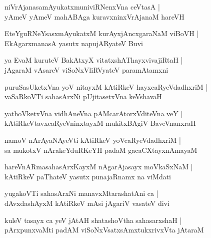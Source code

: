 \documentclass[twoside,12pt,openright]{book}
\newcounter{shloka}[chapter]
\begin{document}
\begin{shloka}%
niVrAjanasamAyukatxmuniviRNenxVna ceVtasA |\\
yAmeV yAmeV mahABAga kuravxninxVrAjanaM hareVH 
\end{shloka}

\begin{shloka}%
EteYguRNeYsasxmAyukatxM kurAyxjAncxgaraNaM viBoVH |\\
EkAgarxmanasA yasutx napujARyateV Buvi
\end{shloka}

\begin{shloka}%
ya EvaM kuruteV BakAtxyX vitatxshAThayxvivajiRtaH |\\
jAgaraM vAsareV viSoNxVliRVyateV paramAtamxni
\end{shloka}

\begin{shloka}%
puruSasUketxVna yoV nitayxM kAtiRkeV hayxcaRyeVdadhxriM |\\
vaSaRkoVTi sahasArxNi pUjitasetxVna keVshavaH 
\end{shloka}

\begin{shloka}%
yathoVketxVna vidhAneVna pAMcarAtorxVditeVna veY |\\
kAtiRkeVtavxcaRyeVninxtayxM mukitxBAgiV BaveVnanxraH 
\end{shloka}

\begin{shloka}%
namoV nArAyaNAyeVti kAtiRkeV yoVcaRyeVdadhxriM |\\
sa mukotxV nArakeYduRKeYH padaM gacaCXtayxnAmayaM 
\end{shloka}

\begin{shloka}%
hareVnARmasahasArxKayxM nAgarAjasayx moVkaSxNaM |\\
kAtiRkeV paThateV yasutx punajaRnamx na viMdati 
\end{shloka}

\begin{shloka}%
yugakoVTi sahasArxNi manavxMtarashatAni ca |\\
dAvxdashAyxM kAtiRkeV mAsi jAgariV vasateV divi
\end{shloka}

\begin{shloka}%
kuleV tasayx ca yeV jAtAH shatashoVtha sahasarxshaH |\\
pArxpunxvaMti padAM viSoNxVsatxsAmxtukxrivxVta jAtaraM 
\end{shloka}
\end{document}

